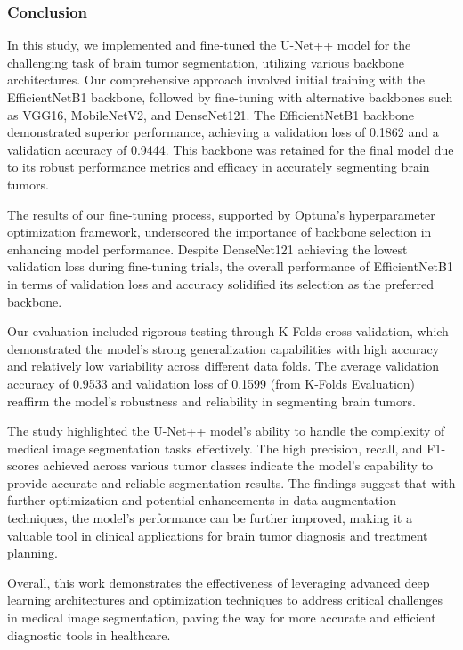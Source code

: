 \subsubsection{Conclusion}\label{s:conclusion}

In this study, we implemented and fine-tuned the U-Net++ model for the challenging task of brain tumor segmentation, utilizing various backbone architectures. Our comprehensive approach involved initial training with the EfficientNetB1 backbone, followed by fine-tuning with alternative backbones such as VGG16, MobileNetV2, and DenseNet121. The EfficientNetB1 backbone demonstrated superior performance, achieving a validation loss of 0.1862 and a validation accuracy of 0.9444. This backbone was retained for the final model due to its robust performance metrics and efficacy in accurately segmenting brain tumors.

The results of our fine-tuning process, supported by Optuna's hyperparameter optimization framework, underscored the importance of backbone selection in enhancing model performance. Despite DenseNet121 achieving the lowest validation loss during fine-tuning trials, the overall performance of EfficientNetB1 in terms of validation loss and accuracy solidified its selection as the preferred backbone.

Our evaluation included rigorous testing through K-Folds cross-validation, which demonstrated the model's strong generalization capabilities with high accuracy and relatively low variability across different data folds. The average validation accuracy of 0.9533 and validation loss of 0.1599 (from K-Folds Evaluation) reaffirm the model's robustness and reliability in segmenting brain tumors.

The study highlighted the U-Net++ model's ability to handle the complexity of medical image segmentation tasks effectively. The high precision, recall, and F1-scores achieved across various tumor classes indicate the model's capability to provide accurate and reliable segmentation results. The findings suggest that with further optimization and potential enhancements in data augmentation techniques, the model's performance can be further improved, making it a valuable tool in clinical applications for brain tumor diagnosis and treatment planning.

Overall, this work demonstrates the effectiveness of leveraging advanced deep learning architectures and optimization techniques to address critical challenges in medical image segmentation, paving the way for more accurate and efficient diagnostic tools in healthcare.

